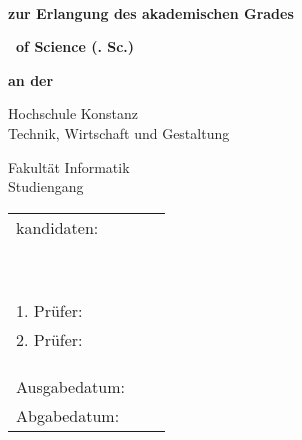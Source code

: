 \begin{titlepage}

\AddToShipoutPicture*{\BackgroundImgTitelPage}

\vspace*{\bigskipamount}


{\makeatletter
\fboxsep=0pt
\colorbox{htwg-white}{\begin{minipage}[t]{145mm}
    \begin{flushleft}
        \color{htwg-teal}\Huge{\@report@typetext}
        \\
        \color{htwg-teal}\Huge\textbf{\@title}
    \end{flushleft}
\end{minipage}}
\makeatother}

\bigskip
\bigskip

{
\setlength{\parskip}{0.5cm}
\begin{center}
	\textbf{zur Erlangung des akademischen Grades}
	
	\textbf{\Large \type\ of Science (\typeshortcut. Sc.)}
	
	\textbf{an der}
	
	\textsf{\huge Hochschule Konstanz}\\
	{\small Technik, Wirtschaft und Gestaltung}
	
    \textsf{\Large Fakultät Informatik} \\
	Studiengang \studiengang
	
\end{center}
}

\bigskip
\bigskip
\bigskip

\begin{center}
	\begingroup
	\renewcommand*{\arraystretch}{1}
	{\makeatletter
		\begin{tabular}{lll}
			\type kandidaten: & \verfasserA \\
							& \strasseA \\
							& \wohnortA \\ \\
							& \verfasserB \\
							& \strasseB \\
							& \wohnortB \\ \\ \\ \\
	
			1. Prüfer: & \prueferA \\
			2. Prüfer: & \prueferB \\ \\ \\ \\
			
			Ausgabedatum: & \ausgabedatum \\
			Abgabedatum: & \abgabedatum
		\end{tabular}
		\makeatother}
	\endgroup
\end{center}


\end{titlepage}


